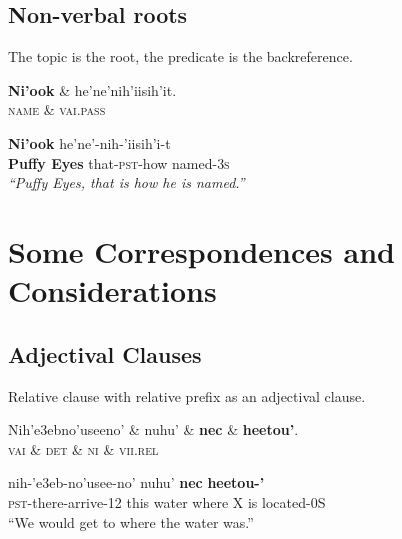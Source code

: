 \documentclass{handout}
\begin{document}
\begin{multicols}{2}
\subsection{Non-verbal roots}
\begin{exe}
\ex \label{topic} The topic is the root, the predicate is the backreference.
\footnotesize
\begin{dependency}
\begin{deptext}
\textbf{Ni'ook} \& he'ne'nih'iisih'it.\\
\textsc{name} \& \textsc{vai.pass}\\
\end{deptext}
\end{dependency}
\gll \textbf{{Ni'ook}} {he'ne'-nih-'iisih'i-t}\\
\textbf{{Puffy Eyes}} {that-\textsc{pst}-how named-\textsc{3s}}\\
\trans \textit{``Puffy Eyes, that is how he is named.''}
\end{exe}

\section{Some Correspondences and Considerations}
\subsection{Adjectival Clauses}
\footnotesize
\begin{exe}
\ex \label{RLCL1} Relative clause with relative prefix as an adjectival clause.\\ %
\begin{dependency}
\begin{deptext}
Nih'e3ebno'useeno' \& nuhu' \& \textbf{nec} \& \textbf{heetou'}.\\
\textsc{vai} \& \textsc{det} \& \textsc{ni} \& \textsc{vii.rel}\\
\end{deptext}
\end{dependency}
\gll
{nih-'e3eb-no'usee-no'} nuhu' \textbf{nec} \textbf{heetou-'}\\
{\textsc{pst}-there-arrive-12} this  water {where X is located-0S}\\
\trans ``We would get to where the water was.''
\end{exe}

\end{multicols}
\end{document}
